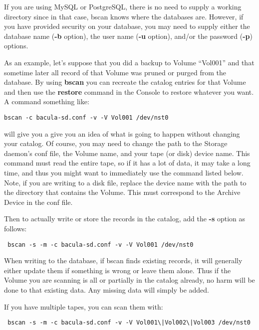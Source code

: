 If you are using MySQL or PostgreSQL, there is no need to supply a working
directory since in that case, bscan knows where the databases are. However, if
you have provided security on your database, you may need to supply either the
database name ({\bf -b} option), the user name ({\bf -u} option), and/or the
password ({\bf -p}) options. 

As an example, let's suppose that you did a backup to Volume ``Vol001'' and
that sometime later all record of that Volume was pruned or purged from the
database. By using {\bf bscan} you can recreate the catalog entries for that
Volume and then use the {\bf restore} command in the Console to restore
whatever you want. A command something like: 

\footnotesize
\begin{verbatim}
bscan -c bacula-sd.conf -v -V Vol001 /dev/nst0
\end{verbatim}
\normalsize

will give you a give you an idea of what is going to happen without changing
your catalog. Of course, you may need to change the path to the Storage
daemon's conf file, the Volume name, and your tape (or disk) device name. This
command must read the entire tape, so if it has a lot of data, it may take a
long time, and thus you might want to immediately use the command listed
below. Note, if you are writing to a disk file, replace the device name with
the path to the directory that contains the Volume. This must correspond to
the Archive Device in the conf file. 

Then to actually write or store the records in the catalog, add the {\bf -s}
option as follows: 

\footnotesize
\begin{verbatim}
 bscan -s -m -c bacula-sd.conf -v -V Vol001 /dev/nst0
\end{verbatim}
\normalsize

When writing to the database, if bscan finds existing records, it will
generally either update them if something is wrong or leave them alone. Thus
if the Volume you are scanning is all or partially in the catalog already, no
harm will be done to that existing data. Any missing data will simply be
added. 

If you have multiple tapes, you can scan them with: 

\footnotesize
\begin{verbatim}
 bscan -s -m -c bacula-sd.conf -v -V Vol001\|Vol002\|Vol003 /dev/nst0
\end{verbatim}
\normalsize

